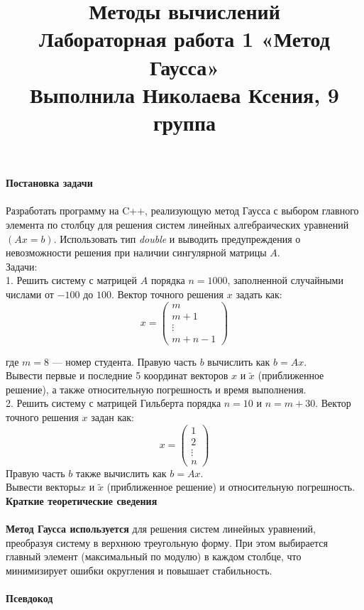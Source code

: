 \documentclass[a4paper, 12pt]{report}
\title{\textbf{\Huge{Методы вычислений}}\\Лабораторная работа 1 «Метод Гаусса»\\Выполнила Николаева Ксения, 9 группа}
\date{}
\begin{document}
    \maketitle

    \textbf{\Huge{Постановка задачи}}\\\\
    Разработать программу на C++, реализующую метод Гаусса с выбором главного элемента по столбцу для решения систем линейных алгебраических уравнений $( Ax = b )$. Использовать тип \textit{double} и выводить предупреждения о невозможности решения при наличии сингулярной матрицы $A$.\\
    Задачи:\\
    1. Решить систему с матрицей $A$ порядка $n = 1000$, заполненной случайными числами от $-100$ до $100$. Вектор точного решения $x$ задать как:
    \[
   x = \begin{pmatrix}
   m \\
   m + 1 \\
   \vdots \\
   m + n - 1
   \end{pmatrix}
   \]
   
   где $m = 8$ — номер студента. Правую часть $b$ вычислить как $b = Ax$.\\ 
   Вывести первые и последние 5 координат векторов $x$ и $ \tilde{x}$ (приближенное решение), а также относительную погрешность и время выполнения.\\
   2. Решить систему с матрицей Гильберта порядка $n = 10$ и $n = m + 30$. Вектор точного решения $x$ задан как:
   \[
   x = \begin{pmatrix}
   1 \\
   2 \\
   \vdots \\
   n
   \end{pmatrix}
   \]
   Правую часть $b$ также вычислить как $b = Ax$.\\
   Вывести векторы$x$ и $\tilde{x}$ (приближенное решение) и относительную погрешность.\\

   \newpage
   \textbf{\Huge{Краткие теоретические сведения}}\\\\
   \textbf{Метод Гаусса используется} для решения систем линейных уравнений, преобразуя систему в верхнюю треугольную форму. При этом выбирается главный элемент (максимальный по модулю) в каждом столбце, что минимизирует ошибки округления и повышает стабильность.\\\\
   \textbf{Псевдокод}
\end{document}
